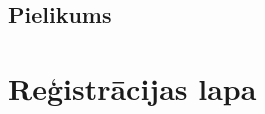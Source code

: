 \documentclass{LU}
\begin{document}

\begin{appendices}
\chapter*{Pielikums}

\end{appendices}


\chapter*{Reģistrācijas lapa}

\end{document}
